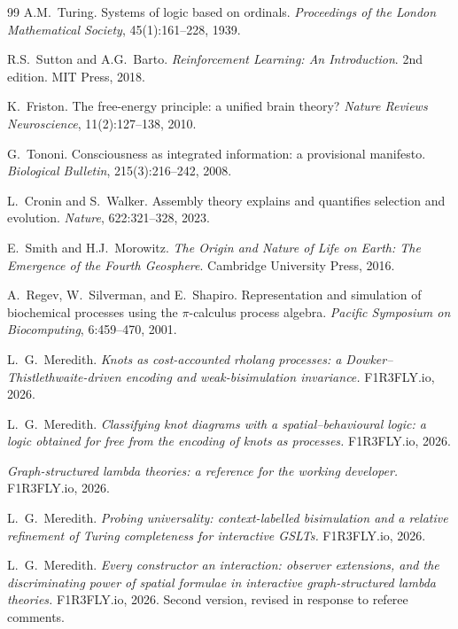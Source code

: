 \begin{thebibliography}{99}
A.M.~Turing. \newblock Systems of logic based on ordinals. \newblock \emph{Proceedings of the London Mathematical Society}, 45(1):161--228, 1939.

R.S.~Sutton and A.G.~Barto. \newblock \emph{Reinforcement Learning: An Introduction}. \newblock 2nd edition. MIT Press, 2018.

K.~Friston. \newblock The free-energy principle: a unified brain theory? \newblock \emph{Nature Reviews Neuroscience}, 11(2):127--138, 2010.

G.~Tononi. \newblock Consciousness as integrated information: a provisional manifesto. \newblock \emph{Biological Bulletin}, 215(3):216--242, 2008. %

L.~Cronin and S.~Walker. \newblock Assembly theory explains and quantifies selection and evolution. \newblock \emph{Nature}, 622:321--328, 2023.

E.~Smith and H.J.~Morowitz. \newblock \emph{The Origin and Nature of Life on Earth: The Emergence of the Fourth Geosphere}. \newblock Cambridge University Press, 2016.

A.~Regev, W.~Silverman, and E.~Shapiro. \newblock Representation and simulation of biochemical processes using the $\pi$-calculus process algebra. \newblock \emph{Pacific Symposium on Biocomputing}, 6:459--470, 2001.

L.\ G.\ Meredith. \emph{Knots as cost-accounted rholang processes: a Dowker--Thistlethwaite-driven encoding and weak-bisimulation invariance.} F1R3FLY.io, 2026.

L.\ G.\ Meredith. \emph{Classifying knot diagrams with a spatial--behavioural logic: a logic obtained for free from the encoding of knots as processes.} F1R3FLY.io, 2026.

\emph{Graph-structured lambda theories: a reference for the working developer.} F1R3FLY.io, 2026.

L.\ G.\ Meredith. \emph{Probing universality: context-labelled bisimulation and a relative refinement of Turing completeness for interactive GSLTs.} F1R3FLY.io, 2026.

L.\ G.\ Meredith. \emph{Every constructor an interaction: observer extensions, and the discriminating
power of spatial formulae in interactive graph-structured lambda theories.} F1R3FLY.io, 2026. Second
version, revised in response to referee comments.


\end{thebibliography}
